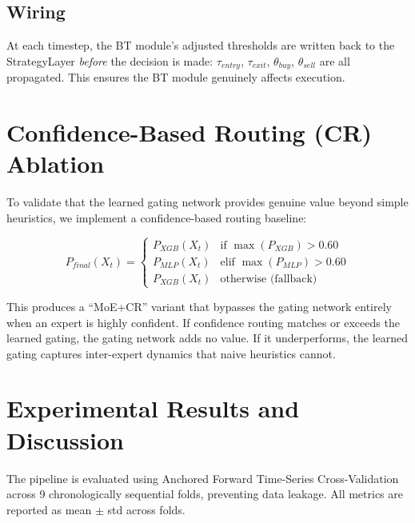 \documentclass[conference]{IEEEtran}
\begin{document}
\subsection{Wiring}
At each timestep, the BT module's adjusted thresholds are written back
to the StrategyLayer \textit{before} the decision is made:
$\tau_{entry}$, $\tau_{exit}$, $\theta_{buy}$, $\theta_{sell}$ are all
propagated. This ensures the BT module genuinely affects execution.

\section{Confidence-Based Routing (CR) Ablation}

To validate that the learned gating network provides genuine value beyond
simple heuristics, we implement a confidence-based routing baseline:

\begin{equation}
    P_{final}(X_t) = \begin{cases}
        P_{XGB}(X_t) & \text{if } \max(P_{XGB}) > 0.60 \\
        P_{MLP}(X_t) & \text{elif } \max(P_{MLP}) > 0.60 \\
        P_{XGB}(X_t) & \text{otherwise (fallback)}
    \end{cases}
\end{equation}

This produces a ``MoE+CR'' variant that bypasses the gating network
entirely when an expert is highly confident. If confidence routing
matches or exceeds the learned gating, the gating network adds no value.
If it underperforms, the learned gating captures inter-expert dynamics
that naive heuristics cannot.

\section{Experimental Results and Discussion}

The pipeline is evaluated using Anchored Forward Time-Series
Cross-Validation across 9 chronologically sequential folds, preventing
data leakage. All metrics are reported as mean $\pm$ std across folds.
\end{document}
